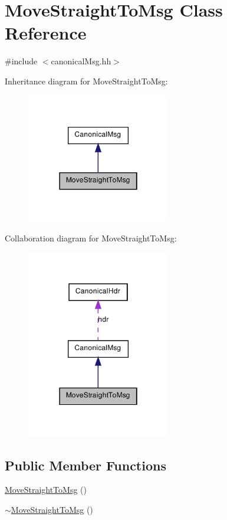 \hypertarget{class_move_straight_to_msg}{
\section{MoveStraightToMsg Class Reference}
\label{class_move_straight_to_msg}
}


{\ttfamily \#include $<$canonicalMsg.hh$>$}



Inheritance diagram for MoveStraightToMsg:\nopagebreak
\begin{figure}[H]
\begin{center}
\leavevmode
\includegraphics[width=178pt]{class_move_straight_to_msg__inherit__graph}
\end{center}
\end{figure}


Collaboration diagram for MoveStraightToMsg:\nopagebreak
\begin{figure}[H]
\begin{center}
\leavevmode
\includegraphics[width=178pt]{class_move_straight_to_msg__coll__graph}
\end{center}
\end{figure}
\subsection*{Public Member Functions}
\begin{DoxyCompactItemize}
\item 
\hyperlink{class_move_straight_to_msg_a97d7feccc5fa599efddb51ab48d7daca}{MoveStraightToMsg} ()
\item 
\hyperlink{class_move_straight_to_msg_a91d3bc5ccb0e8b2d5e3a04da99311084}{$\sim$MoveStraightToMsg} ()
\end{DoxyCompactItemize}


